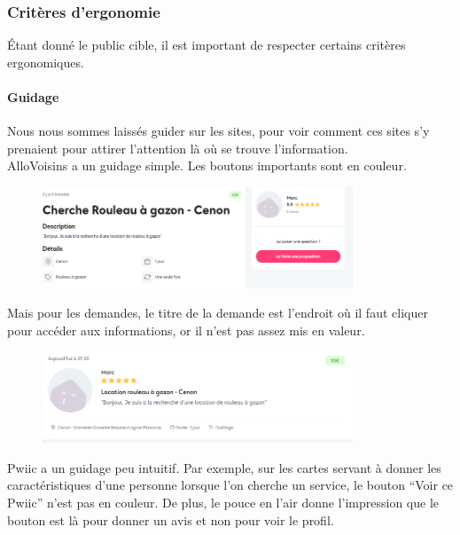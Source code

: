 \documentclass[a4paper,11pt]{article}
\begin{document}
\subsubsection{Critères d'ergonomie}

Étant donné le public cible, il est important de respecter certains critères ergonomiques.\\

\paragraph{Guidage}

Nous nous sommes laissés guider sur les sites, pour voir comment ces sites s’y prenaient pour attirer
l’attention là où se trouve l’information.\\

AlloVoisins a un guidage simple. Les boutons importants sont en couleur.\\

\begin{figure}[H]
  \includegraphics[width=350px]{images/Guidage-allovoisins.png}
  \label{fig:Guidage-allovoisins}
\end{figure}

Mais pour les demandes, le titre de la demande est l’endroit où il faut cliquer pour accéder aux informations,
or il n’est pas assez mis en valeur.\\

\begin{figure}[H]
  \includegraphics[width=350px]{images/demande-allovoisins.png}
  \label{fig:demande-allovoisins}
\end{figure}

Pwiic a un guidage peu intuitif. Par exemple, sur les cartes servant à donner les caractéristiques d’une personne
lorsque l’on cherche un service, le bouton “Voir ce Pwiic” n’est pas en couleur. De plus, le pouce en l’air donne
l’impression que le bouton est là pour donner un avis et non pour voir le profil.\\
\end{document}
